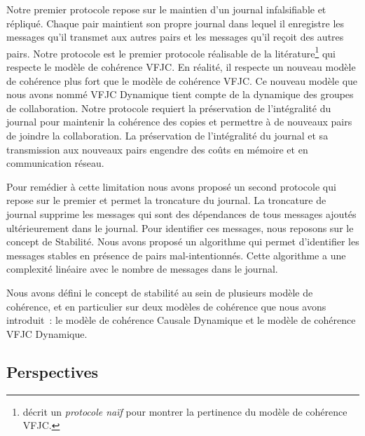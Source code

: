 Notre premier protocole repose sur le maintien d'un journal infalsifiable et répliqué.
Chaque pair maintient son propre journal dans lequel il enregistre les messages qu'il transmet aux autres pairs et les messages qu'il reçoit des autres pairs.
Notre protocole est le premier protocole réalisable de la litérature\footnote{\textcite{mahajan_2011_cac} décrit un \emph{protocole naïf} pour montrer la pertinence du modèle de cohérence \acs{VFJC}.} qui respecte le modèle de cohérence \acf{VFJC}.
En réalité, il respecte un nouveau modèle de cohérence plus fort que le modèle de cohérence \acs{VFJC}.
Ce nouveau modèle que nous avons nommé \acl{VFJC} Dynamique tient compte de la dynamique des groupes de collaboration.
Notre protocole requiert la préservation de l'intégralité du journal pour maintenir la cohérence des copies et permettre à de nouveaux pairs de joindre la collaboration.
La préservation de l'intégralité du journal et sa transmission aux nouveaux pairs engendre des coûts en mémoire et en communication réseau.

Pour remédier à cette limitation nous avons proposé un second protocole qui repose sur le premier et permet la troncature du journal.
La troncature de journal supprime les messages qui sont des dépendances de tous messages ajoutés ultérieurement dans le journal.
Pour identifier ces messages, nous reposons sur le concept de Stabilité.
Nous avons proposé un algorithme qui permet d'identifier les messages stables en présence de pairs mal-intentionnés.
Cette algorithme a une complexité linéaire avec le nombre de messages dans le journal.

Nous avons défini le concept de stabilité au sein de plusieurs modèle de cohérence, et en particulier sur deux modèles de cohérence que nous avons introduit~: le modèle de cohérence Causale Dynamique et le modèle de cohérence \acl{VFJC} Dynamique.

\subsection{Perspectives}


